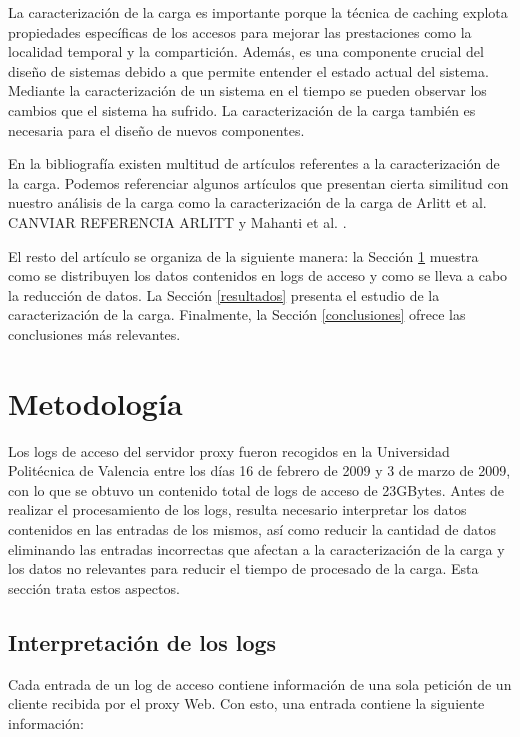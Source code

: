 \documentclass[twocolumn]{Jornadas}
\begin{document}
La caracterización de la carga es importante porque la técnica de caching explota propiedades específicas de los accesos para mejorar las prestaciones como la localidad temporal y la compartición. Además, es una componente crucial del diseño de sistemas debido a que permite entender el estado actual del sistema. Mediante la caracterización de un sistema en el tiempo se pueden observar los cambios que el sistema ha sufrido. La caracterización de la carga también es necesaria para el diseño de nuevos componentes.

En la bibliografía existen multitud de artículos referentes a la caracterización de la carga. Podemos referenciar algunos artículos que presentan cierta similitud con nuestro análisis de la carga como la caracterización de la carga de Arlitt et al. \cite{arlitt} CANVIAR REFERENCIA ARLITT y Mahanti et al. \cite{mahanti}.

El resto del artículo se organiza de la siguiente manera: la
Sección \ref{meto} muestra como se distribuyen los datos contenidos en logs de acceso y como se lleva a cabo la reducción de datos. La Sección \ref{resultados} presenta el estudio de la caracterización de la carga. Finalmente, la Sección \ref{conclusiones} ofrece las conclusiones más relevantes.

\section{Metodología}
\label{meto}

Los logs de acceso del servidor proxy fueron recogidos en la Universidad Politécnica de Valencia entre los días 16 de febrero de 2009 y 3 de marzo de 2009, con lo que se obtuvo un contenido total de logs de acceso de 23GBytes. Antes de realizar el procesamiento de los logs, resulta necesario interpretar los datos contenidos en las entradas de los mismos, así como reducir la cantidad de datos eliminando las entradas incorrectas que afectan a la caracterización de la carga y los datos no relevantes para reducir el tiempo de procesado de la carga. Esta sección trata estos aspectos.

\subsection{Interpretación de los logs}

Cada entrada de un log de acceso contiene información de una sola petición de un cliente recibida por el proxy Web. Con esto, una entrada contiene la siguiente información:
\end{document}
